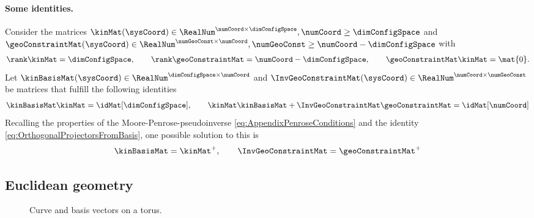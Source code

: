 \paragraph{Some identities.}
Consider the matrices $\kinMat(\sysCoord) \in \RealNum^{\numCoord\times\dimConfigSpace}, \numCoord \geq \dimConfigSpace$ and $\geoConstraintMat(\sysCoord)\in\RealNum^{\numGeoConst\times\numCoord}, \numGeoConst \geq \numCoord-\dimConfigSpace$ with
\begin{align}
 \rank\kinMat = \dimConfigSpace,
\qquad
 \rank\geoConstraintMat = \numCoord - \dimConfigSpace,
\qquad
 \geoConstraintMat\kinMat = \mat{0}.
\end{align}
Let $\kinBasisMat(\sysCoord)\in\RealNum^{\dimConfigSpace\times\numCoord}$ and $\InvGeoConstraintMat(\sysCoord)\in\RealNum^{\numCoord\times\numGeoConst}$ be matrices that fulfill the following identities
\begin{align}
 \kinBasisMat \kinMat = \idMat[\dimConfigSpace],
\qquad
 \kinMat \kinBasisMat + \InvGeoConstraintMat \geoConstraintMat = \idMat[\numCoord]
\end{align}
Recalling the properties of the Moore-Penrose-pseudoinverse \eqref{eq:AppendixPenroseConditions} and the identity \eqref{eq:OrthogonalProjectorsFromBasis}, one possible solution to this is
\begin{align}
 \kinBasisMat = \kinMat^+, \qquad \InvGeoConstraintMat = \geoConstraintMat^+
\end{align}

\subsection{Euclidean geometry}
\begin{figure}[h]
 
 \caption{Curve and basis vectors on a torus.}
 \label{fig:EuclideanGeometryBasisVectors}
\end{figure}

